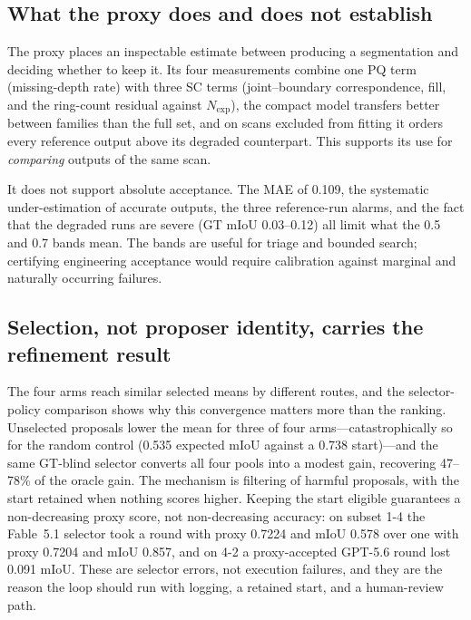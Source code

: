 \documentclass[a4paper,fleqn]{cas-dc}
\begin{document}
\subsection{What the proxy does and does not establish}

The proxy places an inspectable estimate between producing a segmentation and deciding whether to keep it. Its four measurements combine one PQ term (missing-depth rate) with three SC terms (joint--boundary correspondence, fill, and the ring-count residual against $N_{\mathrm{exp}}$), the compact model transfers better between families than the full set, and on scans excluded from fitting it orders every reference output above its degraded counterpart. This supports its use for \emph{comparing} outputs of the same scan.

It does not support absolute acceptance. The MAE of 0.109, the systematic under-estimation of accurate outputs, the three reference-run alarms, and the fact that the degraded runs are severe (GT mIoU 0.03--0.12) all limit what the 0.5 and 0.7 bands mean. The bands are useful for triage and bounded search; certifying engineering acceptance would require calibration against marginal and naturally occurring failures.

\subsection{Selection, not proposer identity, carries the refinement result}

The four arms reach similar selected means by different routes, and the selector-policy comparison shows why this convergence matters more than the ranking. Unselected proposals lower the mean for three of four arms---catastrophically so for the random control (0.535 expected mIoU against a 0.738 start)---and the same GT-blind selector converts all four pools into a modest gain, recovering 47--78\% of the oracle gain. The mechanism is filtering of harmful proposals, with the start retained when nothing scores higher. Keeping the start eligible guarantees a non-decreasing proxy score, not non-decreasing accuracy: on subset 1-4 the Fable~5.1 selector took a round with proxy 0.7224 and mIoU 0.578 over one with proxy 0.7204 and mIoU 0.857, and on 4-2 a proxy-accepted GPT-5.6 round lost 0.091 mIoU. These are selector errors, not execution failures, and they are the reason the loop should run with logging, a retained start, and a human-review path.
\end{document}
